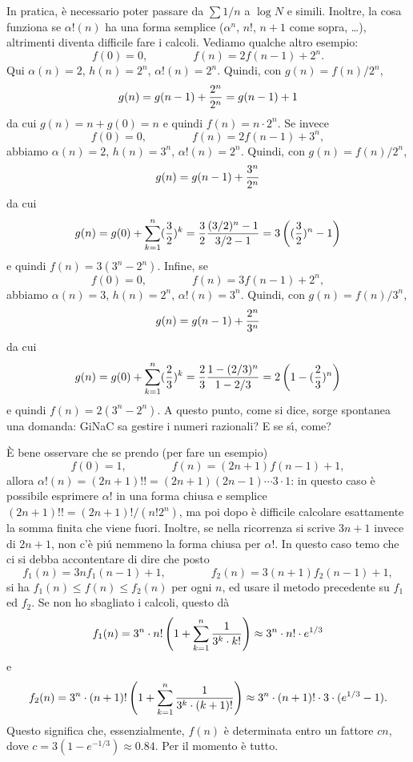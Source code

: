 \documentclass{article}[12]
\begin{document}
In pratica, \`e necessario poter passare da $\sum 1/n$ a $\log N$ e
simili. Inoltre, la cosa 
funziona se $\alpha!(n)$ ha una forma semplice ($\alpha^n$, $n!$,
$n+1$ come sopra, \dots), 
altrimenti diventa difficile fare i calcoli. 
Vediamo qualche altro esempio: 
$$
f(0) = 0, \qquad\qquad f(n) = 2f(n-1) + 2^n.
$$
Qui $\alpha(n)=2$, $h(n)=2^n$, $\alpha!(n)=2^n$. Quindi, con
$g(n)=f(n)/2^n$, 
$$
g(n) = g(n-1) + {2^n\over 2^n} = g(n-1) + 1
$$
da cui $g(n) = n+g(0)=n$ e quindi $f(n) = n\cdot2^n$. 
Se invece 
$$
f(0) = 0, \qquad\qquad f(n) = 2f(n-1) + 3^n,
$$
abbiamo $\alpha(n)=2$, $h(n)=3^n$, $\alpha!(n)=2^n$. Quindi, con
$g(n)=f(n)/2^n$, 
$$
g(n) = g(n-1) + {3^n\over 2^n}
$$
da cui 
$$
g(n) = g(0) + \sum_{k=1}^n ({3\over2})^k = {3\over2} {(3/2)^n-1\over
3/2-1}
= 3 \left( ({3\over2})^n -1\right)
$$
e quindi $f(n) = 3(3^n-2^n)$. 
Infine, se 
$$
f(0) = 0, \qquad\qquad f(n) = 3f(n-1) + 2^n,
$$
abbiamo $\alpha(n)=3$, $h(n)=2^n$, $\alpha!(n)=3^n$. Quindi, con
$g(n)=f(n)/3^n$, 
$$
g(n) = g(n-1) + {2^n\over 3^n}
$$
da cui 
$$
g(n) = g(0) + \sum_{k=1}^n ({2\over3})^k = {2\over3} {1-(2/3)^n\over
1-2/3}
= 2 \left( 1 - ({2\over3})^n \right)
$$
e quindi $f(n) = 2(3^n-2^n)$. A questo punto, come si dice, sorge
spontanea una domanda: 
GiNaC sa gestire i numeri razionali? E se s\'\i, come? 

\`E bene osservare che se prendo (per fare un esempio) 
$$
f(0)=1, \qquad\qquad f(n) = (2n+1) f(n-1) + 1,
$$
allora $\alpha!(n)=(2n+1)!!=(2n+1)(2n-1)\cdots3\cdot1$: in questo caso
\`e possibile esprimere 
$\alpha!$ in una forma chiusa e semplice $(2n+1)!! = (2n+1)!/(n!2^n)$,
ma poi dopo \`e difficile 
calcolare esattamente la somma finita che viene fuori. Inoltre, se
nella ricorrenza si scrive 
$3n+1$ invece di $2n+1$, non c'\`e pi\'u nemmeno la forma chiusa per
$\alpha!$. In questo caso 
temo che ci si debba accontentare di dire che posto 
$$
f_1(n) = 3n f_1(n-1) + 1, \qquad\qquad f_2(n) = 3(n+1) f_2(n-1) + 1,
$$
si ha $f_1(n)\le f(n)\le f_2(n)$ per ogni $n$, ed usare il metodo
precedente su $f_1$ ed $f_2$. 
Se non ho sbagliato i calcoli, questo d\`a 
$$
f_1(n) = 3^n \cdot  n!  \left( 1 + \sum_{k=1}^n {1\over3^k\cdot k!}
\right)
\approx 3^n\cdot n! \cdot e^{1/3}
$$
e
$$
f_2(n) = 3^n \cdot (n+1)! \left( 1 + \sum_{k=1}^n {1\over3^k\cdot
(k+1)!} \right)
\approx 3^n\cdot (n+1)! \cdot 3 \cdot (e^{1/3}-1).
$$
Questo significa che, essenzialmente, $f(n)$ \`e determinata entro un
fattore $cn$, 
dove $c=3(1-e^{-1/3})\approx0.84$. Per il momento \`e tutto. 
\end{document}
